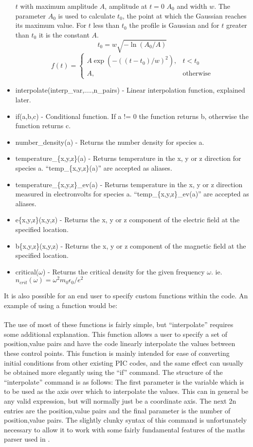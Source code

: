 \begin{itemize}
    $t$ with maximum amplitude $A$, amplitude at $t=0$ $A_0$ and width $w$.
    The parameter $A_0$ is used to calculate $t_0$, the point at which the
    Gaussian reaches its maximum value. For $t$ less than $t_0$ the profile
    is Gaussian and for $t$ greater than $t_0$ it is the constant $A$.
\[
t_0 = w\sqrt{-\ln{(A_0/A)}}
\]\[
f(t) =
\begin{cases}
A \exp{(-((t-t_0)/w)^2)}, & t < t_0 \\
A, & \mbox{otherwise}
\end{cases}
\]
\item interpolate(interp\_var,....,n\_pairs) - Linear interpolation function,
  explained later.
\item if(a,b,c) - Conditional function. If a != 0 the function returns b,
  otherwise the function returns c.

\item number\_density(a) - Returns the number density for species a.
\item temperature\_\{x,y,z\}(a) - Returns temperature in the x, y or z
    direction for species a. ``temp\_\{x,y,z\}(a)'' are accepted as aliases.
\item temperature\_\{x,y,z\}\_ev(a) - Returns temperature in the x, y or z
    direction measured in electronvolts for species a.
    ``temp\_\{x,y,z\}\_ev(a)'' are accepted as aliases.
\item e\{x,y,z\}(x,y,z) - Returns the x, y or z component of the electric
    field at the specified location.
\item b\{x,y,z\}(x,y,z) - Returns the x, y or z component of the magnetic
    field at the specified location.
\item critical($\omega$) - Returns the critical density for the given
    frequency $\omega$. ie. $n_{crit}(\omega) = \omega^2 m_0 \epsilon_0 / e^2$
\end{itemize}

It is also possible for an end user to specify custom functions within the
code. An example of using a function would be:\\
\indent{}\\

The use of most of these functions is fairly simple, but
``interpolate'' requires some additional explanation. This function allows a
user to specify a set of position,value pairs and have the code linearly
interpolate the values between these control points. This function is mainly
intended for ease of converting initial conditions from other existing PIC
codes, and the same effect can usually be obtained more elegantly using the
``if'' command. The structure of the ``interpolate'' command is as follows:
The first parameter is the variable which is to be used as the axis over which
to interpolate the values. This can in general be any valid expression, but
will normally just be a coordinate axis. The next 2n entries are the
position,value pairs and the final parameter is the number of position,value
pairs. The slightly clunky syntax of this command is unfortunately necessary to
allow it to work with some fairly fundamental features of the maths parser
used in {\EPOCH}.

